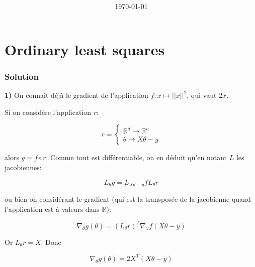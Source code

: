 \documentclass[
10pt, %
a4paper, %
oneside, %
headinclude,footinclude, %
BCOR5mm, %
]{scrartcl}
\title{\normalfont{FTML Exercices 2 solutions}\\
}
\author{\spacedlowsmallcaps{}
}
\date{\today}
\begin{document}
\renewcommand{\sectionmark}[1]{\markright{\spacedlowsmallcaps{#1}}}
\lehead{\mbox{\llap{\small\thepage\kern1em\color{halfgray} \vline}\color{halfgray}\hspace{0.5em}\rightmark\hfil}} 
\pagestyle{scrheadings}
\maketitle 
\setcounter{tocdepth}{3} 

\tableofcontents

\section{\large\color{Blue}Ordinary least squares}

\subsubsection{Solution}%
\label{ssub:Solution}

\textbf{1)} On connaît déjà le gradient de l'application $f: x\mapsto ||x||^2$, qui vaut
$2x$.

Si on considère l'application $r$:

$$
r = \left\{
    \begin{array}{ll}
        \mathbb{R}^d \rightarrow \mathbb{R}^n  \\
	\theta\mapsto X\theta-y
    \end{array}
\right.
$$

alors $g = f \circ r$. Comme tout est différentiable, on en déduit qu'en notant
$L$ les jacobiennes:

\begin{equation}
    L_{\theta}g = L_{X\theta-y}fL_{\theta}r
\end{equation}

ou bien on considérant le gradient (qui est la transposée de la jacobienne
quand l'application est à valeurs dans $ \mathbb{R} $):

\begin{equation}
    \nabla_{\theta}g(\theta) = (L_{\theta}r)^T\nabla_{x}f(X\theta-y)
\end{equation}

Or $L_{\theta}r = X$. Donc

\begin{equation}
    \nabla_{\theta}g(\theta) = 2X^T(X\theta-y)
\end{equation}
\end{document}
